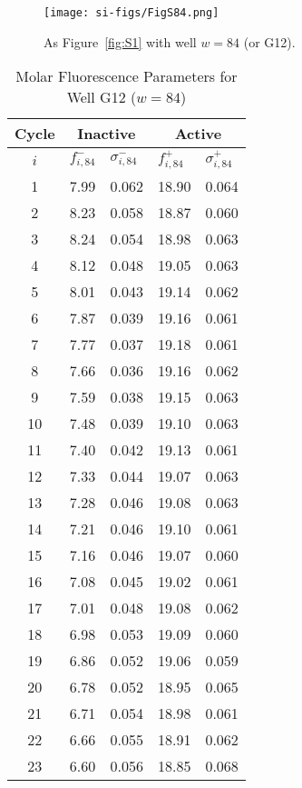                 \begin{figure}
                    \centering
                    \texttt{[image: si-figs/FigS84.png]}
                    \caption{
                        As Figure~\ref{fig:S1} with well $w=84$ (or G12).
                    }
                \end{figure}
                \clearpage
    \begin{table}
        \caption{Molar Fluorescence Parameters for Well G12 ($w=84$)}
        \centering
        \begin{tabular}{c|ll|ll}
            Cycle & \multicolumn{2}{c|}{Inactive} & \multicolumn{2}{c}{Active} \\
            \hline
            $i$ & $f_{i,84}^{-}$ & $\sigma_{i,84}^{-}$ &  $f_{i,84}^{+}$ & $\sigma_{i,84}^{+}$ \\
            \hline
    1 & 7.99 & 0.062 & 18.90 & 0.064 \\
2 & 8.23 & 0.058 & 18.87 & 0.060 \\
3 & 8.24 & 0.054 & 18.98 & 0.063 \\
4 & 8.12 & 0.048 & 19.05 & 0.063 \\
5 & 8.01 & 0.043 & 19.14 & 0.062 \\
6 & 7.87 & 0.039 & 19.16 & 0.061 \\
7 & 7.77 & 0.037 & 19.18 & 0.061 \\
8 & 7.66 & 0.036 & 19.16 & 0.062 \\
9 & 7.59 & 0.038 & 19.15 & 0.063 \\
10 & 7.48 & 0.039 & 19.10 & 0.063 \\
11 & 7.40 & 0.042 & 19.13 & 0.061 \\
12 & 7.33 & 0.044 & 19.07 & 0.063 \\
13 & 7.28 & 0.046 & 19.08 & 0.063 \\
14 & 7.21 & 0.046 & 19.10 & 0.061 \\
15 & 7.16 & 0.046 & 19.07 & 0.060 \\
16 & 7.08 & 0.045 & 19.02 & 0.061 \\
17 & 7.01 & 0.048 & 19.08 & 0.062 \\
18 & 6.98 & 0.053 & 19.09 & 0.060 \\
19 & 6.86 & 0.052 & 19.06 & 0.059 \\
20 & 6.78 & 0.052 & 18.95 & 0.065 \\
21 & 6.71 & 0.054 & 18.98 & 0.061 \\
22 & 6.66 & 0.055 & 18.91 & 0.062 \\
23 & 6.60 & 0.056 & 18.85 & 0.068 \\

\end{tabular}
\end{table}
